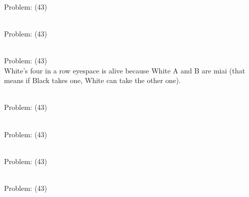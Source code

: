 \documentclass[11pt]{article}
\begin{document}
\begin{minipage}[t]{0.5\textwidth}
  {\centering
  
\\
Problem: (43)\\
  }
\end{minipage}
\begin{minipage}[t]{0.5\textwidth}
  {\centering
  
\\
Problem: (43)\\
  }
\end{minipage}
\begin{minipage}[t]{0.5\textwidth}
  {\centering
  
\\
Problem: (43)\\
White's four in a row eyespace is alive because White A and B are miai (that means if Black takes one, White can take the other one).\\
  }
\end{minipage}
\begin{minipage}[t]{0.5\textwidth}
  {\centering
  
\\
Problem: (43)\\
  }
\end{minipage}
\begin{minipage}[t]{0.5\textwidth}
  {\centering
  
\\
Problem: (43)\\
  }
\end{minipage}
\begin{minipage}[t]{0.5\textwidth}
  {\centering
  
\\
Problem: (43)\\
  }
\end{minipage}
\begin{minipage}[t]{0.5\textwidth}
  {\centering
  
\\
Problem: (43)\\
  }
\end{minipage}
\end{document}
